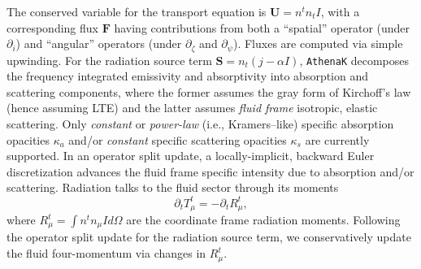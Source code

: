 \documentclass[twocolumn, floatfix]{aastex63}
\newcommand{\ak}{\texttt{AthenaK}}
\begin{document}
The conserved variable for the transport equation is $\mathbf{U} = n^t n_t I$, with a corresponding flux $\mathbf{F}$ having contributions from both a ``spatial'' operator (under $\partial_i$) and ``angular'' operators (under $\partial_\zeta$ and $\partial_\psi$).  Fluxes are computed via simple upwinding.  For the radiation source term $\mathbf{S} = n_t \left(j - \alpha I \right)$, \ak{} decomposes the frequency integrated emissivity and absorptivity into absorption and scattering components, where the former assumes the gray form of Kirchoff's law (hence assuming LTE) and the latter assumes \textit{fluid frame} isotropic, elastic scattering.  Only \textit{constant} or \textit{power-law} (i.e., Kramers--like) specific absorption opacities $\kappa_a$ and/or \textit{constant} specific scattering opacities $\kappa_s$ are currently supported. In an operator split update, a locally-implicit, backward Euler discretization advances the fluid frame specific intensity due to absorption and/or scattering.   Radiation talks to the fluid sector through its moments
\begin{equation}
    \partial_t T^t_\mu = - \partial_t R^t_\mu,
\label{eq:rad_couple}
\end{equation}
where $R^t_\mu = \int n^t n_\mu I d \Omega$ are the coordinate frame radiation moments.
Following the operator split update for the radiation source term, we conservatively update the fluid four-momentum via changes in $R^t_\mu$.
\end{document}

